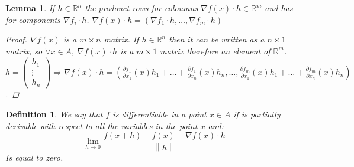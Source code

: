 \documentclass{article}
\newtheorem{lemma}{Lemma}
\newtheorem{definition}{Definition}
\begin{document}
            \begin{lemma}
                If $h \in \mathbb{R}^n$ the prodouct rows for coloumns $\nabla f(x) \cdot h \in \mathbb{R}^m$ and has for components $\nabla f_i \cdot h$. $\nabla f(x) \cdot h = \left(\nabla f_1 \cdot h, \dots, \nabla f_m \cdot h\right)$
                \begin{proof}
                    $\nabla f(x)$ is a $m \times n$ matrix. If $h \in \mathbb{R}^n$ then it can be written as a $n \times 1$ matrix, so $\forall x \in A, \ \nabla f(x) \cdot h$ is a $m \times 1$ matrix therefore an element of $\mathbb{R}^m $.  $h = \left( \begin{matrix} h_1 \\ \vdots \\ h_n \end{matrix} \right) \Longrightarrow \nabla f(x) \cdot h = \left( \frac{\partial f_1}{\partial x_1}(x)h_1 + \dots + \frac{\partial f_1}{\partial x_n}(x)h_n, \dots, \frac{\partial f_m}{\partial x_1}(x)h_1 + \dots + \frac{\partial f_m}{\partial x_n}(x)h_n\right)$.
                \end{proof}
            \end{lemma}
            \begin{definition}
                We say that $f$ is differentiable in a point $x \in A$ if is partially derivable with respect to all the variables in the point $x$ and:
                \begin{equation*}
                    \lim_{h \to 0 } \frac{f(x +h) - f(x)- \nabla f(x) \cdot h}{\left\lVert h \right\rVert}
                \end{equation*}
                Is equal to zero.
            \end{definition}
            \newpage
\end{document}
